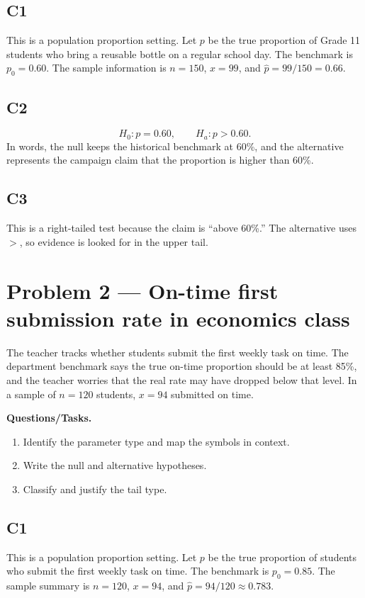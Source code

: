 	\subsection*{C1}
	This is a population proportion setting. Let \(p\) be the true proportion of Grade 11 students who bring a reusable bottle on a regular school day. The benchmark is \(p_0=0.60\). The sample information is \(n=150\), \(x=99\), and \(\hat p=99/150=0.66\).
	
	\subsection*{C2}
	\[
	H_0\colon p=0.60, \qquad H_a\colon p>0.60.
	\]
	In words, the null keeps the historical benchmark at 60\%, and the alternative represents the campaign claim that the proportion is higher than 60\%.
	
	\subsection*{C3}
	This is a right-tailed test because the claim is ``above 60\%.'' The alternative uses \(>\), so evidence is looked for in the upper tail.


	\section{Problem 2 --- On-time first submission rate in economics class}
	The teacher tracks whether students submit the first weekly task on time. The department benchmark says the true on-time proportion should be at least 85\%, and the teacher worries that the real rate may have dropped below that level. In a sample of \(n=120\) students, \(x=94\) submitted on time.
	
	\textbf{Questions/Tasks.}
	\begin{enumerate}
		\item[(C1)] Identify the parameter type and map the symbols in context.
		\item[(C2)] Write the null and alternative hypotheses.
		\item[(C3)] Classify and justify the tail type.
	\end{enumerate}
	
	\subsection*{C1}
	This is a population proportion setting. Let \(p\) be the true proportion of students who submit the first weekly task on time. The benchmark is \(p_0=0.85\). The sample summary is \(n=120\), \(x=94\), and \(\hat p=94/120\approx0.783\).
	
